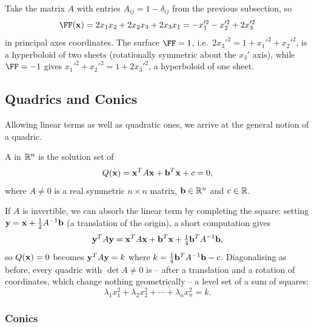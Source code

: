 \documentclass[a4paper]{scrartcl}
\begin{document}
\begin{example}[A Hyperboloid]
	Take the matrix $A$ with entries $A_{ij} = 1 - \delta_{ij}$ from the previous subsection, so
	$$
	\FF(\vv{x}) = 2x_1x_2 + 2x_2 x_3 + 2 x_3 x_1 = -x_1'^2 - x_2'^2 + 2x_3'^2
	$$
	in principal axes coordinates. The surface $\FF = 1$, i.e.\ $2x_3'^2 = 1 + x_1'^2 + x_2'^2$, is a hyperboloid of two sheets (rotationally symmetric about the $x_3'$ axis), while $\FF = -1$ gives $x_1'^2 + x_2'^2 = 1 + 2x_3'^2$, a hyperboloid of one sheet.
\end{example}

\subsection{Quadrics and Conics}

Allowing linear terms as well as quadratic ones, we arrive at the general notion of a quadric.

\begin{definition}[Quadric]
	A  in $\mathbb{R}^n$ is the solution set of
	$$
	Q(\mathbf{x}) = \mathbf{x}^T A \mathbf{x} + \mathbf{b}^T \mathbf{x} + c = 0,
	$$
	where $A \neq 0$ is a real symmetric $n \times n$ matrix, $\mathbf{b} \in \mathbb{R}^n$ and $c \in \mathbb{R}$.
\end{definition}

If $A$ is invertible, we can absorb the linear term by completing the square: setting $\mathbf{y} = \mathbf{x} + \frac{1}{2}A^{-1}\mathbf{b}$ (a translation of the origin), a short computation gives
$$
\mathbf{y}^TA\mathbf{y} = \mathbf{x}^TA\mathbf{x} + \mathbf{b}^T \mathbf{x} + \tfrac{1}{4}\mathbf{b}^TA^{-1}\mathbf{b},
$$
so $Q(\mathbf{x}) = 0$ becomes $\mathbf{y}^TA\mathbf{y} = k$ where $k = \frac{1}{4}\mathbf{b}^TA^{-1}\mathbf{b} - c$. Diagonalising as before, every quadric with $\det A \neq 0$ is -- after a translation and a rotation of coordinates, which change nothing geometrically -- a level set of a sum of squares:
$$
\lambda_1 x_1^2 + \lambda_2 x_2^2 + \cdots + \lambda_n x_n^2 = k.
$$

\subsubsection{Conics}
\end{document}
